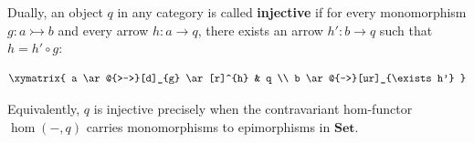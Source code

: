 Dually, an object $q$ in any category is called \textbf{injective} if for every monomorphism $g : a \rightarrowtail b$ and every arrow $h : a \rightarrow q$, there exists an arrow $h' : b \rightarrow q$ such that $h = h' \circ g$:

$$\xymatrix{
a \ar@{>->}[d]_{g} \ar[r]^{h} & q \\
b \ar@{-->}[ur]_{\exists h'}
}$$

Equivalently, $q$ is injective precisely when the contravariant hom-functor $\hom(-, q)$ carries monomorphisms to epimorphisms in $\mathbf{Set}$.
